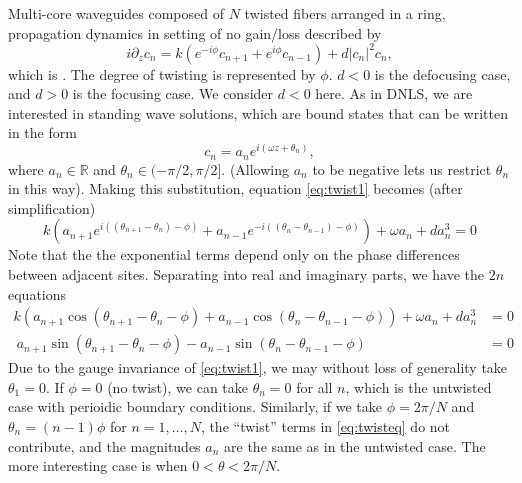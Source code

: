 \documentclass[12pt]{article}
\def\R{{\mathbb R}}
\begin{document}
Multi-core waveguides composed of $N$ twisted fibers arranged in a ring, propagation dynamics in setting of no gain/loss described by 
\begin{equation}\label{eq:twist1}
i \partial_z c_n = k \left(e^{-i\phi}c_{n+1} + e^{i\phi}c_{n-1}\right) + d |c_n|^2 c_n,
\end{equation}
which is \cite[(2.1)]{castro2016}. The degree of twisting is represented by $\phi$. $d < 0$ is the defocusing case, and $d>0$ is the focusing case. We consider $d<0$ here. As in DNLS, we are interested in standing wave solutions, which are bound states that can be written in the form
\begin{equation}\label{eq:ansatz1}
c_n = a_n e^{i (\omega z + \theta_n) },
\end{equation}
where $a_n \in \R$ and $\theta_n \in (-\pi/2, \pi/2]$. (Allowing $a_n$ to be negative lets us restrict $\theta_n$ in this way). Making this substitution, equation \cref{eq:twist1} becomes (after simplification)
\begin{equation}\label{eq:twisteq}
k\left( a_{n+1} e^{i((\theta_{n+1}-\theta_n)-\phi)} + a_{n-1} e^{-i((\theta_n - \theta_{n-1})-\phi)}\right) + \omega a_n + d a_n^3 = 0
\end{equation}
Note that the the exponential terms depend only on the phase differences between adjacent sites. Separating into real and imaginary parts, we have the $2n$ equations
\begin{equation}\label{eq:twisteqreal}
\begin{aligned}
k\left( a_{n+1} \cos(\theta_{n+1}-\theta_n-\phi) + a_{n-1} \cos(\theta_n - \theta_{n-1}-\phi)\right) + \omega a_n + d a_n^3 &= 0 \\\
a_{n+1} \sin(\theta_{n+1}-\theta_n-\phi) - a_{n-1} \sin(\theta_n - \theta_{n-1}-\phi) &= 0
\end{aligned}
\end{equation}
Due to the gauge invariance of \cref{eq:twist1}, we may without loss of generality take $\theta_1 = 0$. If $\phi = 0$ (no twist), we can take $\theta_n = 0$ for all $n$, which is the untwisted case with perioidic boundary conditions. Similarly, if we take $\phi = 2 \pi/N$ and $\theta_n = (n-1)\phi$ for $n = 1, \dots, N$, the ``twist'' terms in \cref{eq:twisteq} do not contribute, and the magnitudes $a_n$ are the same as in the untwisted case. The more interesting case is when $0 < \theta < 2 \pi/N$.
\end{document}
